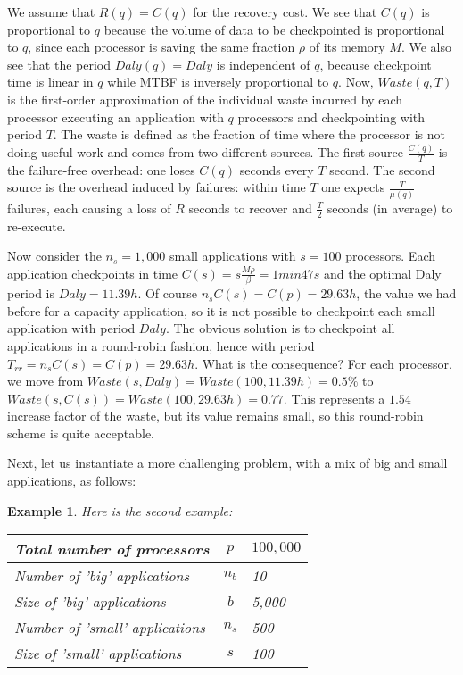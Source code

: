 \documentclass{article}
\newtheorem{example}{Example}
\newcommand{\ema}[1]{\ensuremath{#1}}
\newcommand{\Waste}{\ema{\mathit{Waste}}\xspace}
\newcommand{\Daly}{\ema{\mathit{Daly}}\xspace}
\begin{document}
We assume that $R(q) =C(q)$ for the recovery cost. We see that $C(q)$ is proportional to $q$ because the volume of data to be checkpointed is proportional to $q$, since each
processor is saving the same fraction $\rho$ of its memory $M$.
We also see that the period $\Daly(q)=\Daly$ is independent of
$q$, because checkpoint time is linear in $q$ while MTBF is inversely proportional to $q$.
Now, $\Waste(q,T)$ is the first-order approximation of the individual waste incurred
by each processor executing an application with $q$ 
processors and checkpointing with period $T$. 
The waste is defined as the fraction of time where the processor is not doing useful work and comes from two different sources. The first source $\frac{C(q)}{T} $ is the failure-free overhead:
one loses $C(q)$ seconds every $T$ second. 
The second source is the overhead induced by failures: within time $T$ one expects $ \frac{T}{\mu(q)}$
failures, each causing a loss of $R$ seconds to recover and $\frac{T}{2}$ seconds (in average) to re-execute.

Now consider the $n_{s}=1,000$ small applications with $s=100$ processors.
Each application checkpoints in time $C(s) = s\frac{M \rho}{\beta}  = 1min47s$
and the optimal Daly period is $\Daly = 11.39h$. Of course
$n_{s}C(s) =  C(p) = 29.63h$, the value we had before for a capacity application, so it is not possible to checkpoint each small application with period
$\Daly$. The obvious solution is to checkpoint all applications in  a round-robin fashion, 
hence with period $T_{rr} = n_{s}C(s) =  C(p) = 29.63h$. What is the consequence? For each processor,
we move from $\Waste(s,\Daly) = \Waste(100,11.39h) = 0.5\%$ to
$\Waste(s,C(s)) = \Waste(100,29.63h) = 0.77$. This represents a $1.54$ increase factor of the waste, but its value remains small, so this round-robin scheme is quite acceptable.

Next, let us instantiate a more challenging problem, with 
a mix of big and small applications, as follows:

\begin{example}
Here is the second example:
\begin{center}
\begin{tabular}{lcl}
  Total number of processors & $p$ & $100,000$\\\hline
  Number of 'big' applications & $n_{b}$ & 10\\\hline
  Size of 'big' applications & $b$ & 5,000\\\hline
  Number of 'small' applications & $n_{s}$ & 500\\\hline
  Size of 'small' applications & $s$ & 100\\\hline
\end{tabular}
\end{center}
\label{example2}
\end{example}
\end{document}
